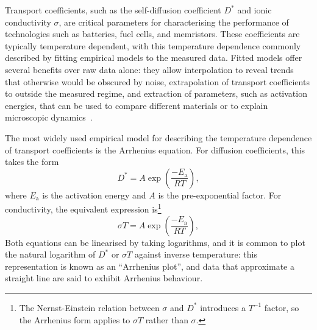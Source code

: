\documentclass[reprint,superscriptaddress,nobibnotes,nofootinbib,amsmath,amssymb,aps,hidelinks]{revtex4-2}
\newcommand{\D}{D^*}
\newcommand{\Ea}{E_{\mathrm{a}}}
\begin{document}
Transport coefficients, such as the self-diffusion coefficient $D^*$ and ionic conductivity $\sigma$, are critical parameters for characterising the performance of technologies such as batteries, fuel cells, and memristors.
These coefficients are typically temperature dependent, with this temperature dependence commonly described by fitting empirical models to the measured data.
Fitted models offer several benefits over raw data alone: they allow interpolation to reveal trends that otherwise would be obscured by noise, extrapolation of transport coefficients to outside the measured regime, and extraction of parameters, such as activation energies, that can be used to compare different materials or to explain microscopic dynamics~\cite{Canepa2022, Wang2021}.

The most widely used empirical model for describing the temperature dependence of transport coefficients is the Arrhenius equation.
For diffusion coefficients, this takes the form
\begin{equation}
    \D = A\exp\left(\frac{-\Ea}{RT}\right),
    \label{eqn:arrhenius_diff}
\end{equation}
where $\Ea$ is the activation energy and $A$ is the pre-exponential factor.
For conductivity, the equivalent expression is\footnote{The Nernst-Einstein relation between $\sigma$ and $\D$ introduces a $T^{-1}$ factor, so the Arrhenius form applies to $\sigma T$ rather than $\sigma$.}
\begin{equation}
    \sigma T = A\exp\left(\frac{-\Ea}{RT}\right),
    \label{eqn:arrhenius}
\end{equation}
Both equations can be linearised by taking logarithms, and it is common to plot the natural logarithm of $D^*$ or $\sigma T$ against inverse temperature: this representation is known as an ``Arrhenius plot'', and data that approximate a straight line are said to exhibit Arrhenius behaviour.

%
\end{document}
